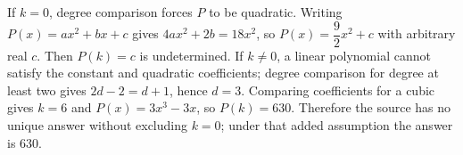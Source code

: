 If $k=0$, degree comparison forces $P$ to be quadratic. Writing $P(x)=ax^2+bx+c$ gives $4ax^2+2b=18x^2$, so $P(x)=\dfrac{9}{2}x^2+c$ with arbitrary real $c$. Then $P(k)=c$ is undetermined. If $k\ne0$, a linear polynomial cannot satisfy the constant and quadratic coefficients; degree comparison for degree at least two gives $2d-2=d+1$, hence $d=3$. Comparing coefficients for a cubic gives $k=6$ and $P(x)=3x^3-3x$, so $P(k)=630$. Therefore the source has no unique answer without excluding $k=0$; under that added assumption the answer is $\boxed{630}$.
